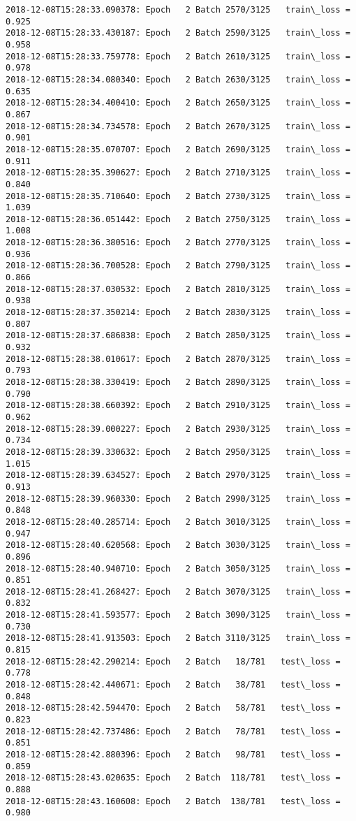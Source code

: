 \documentclass[11pt]{article}
\begin{document}
\begin{Verbatim}[commandchars=\\\{\}]
2018-12-08T15:28:33.090378: Epoch   2 Batch 2570/3125   train\_loss = 0.925
2018-12-08T15:28:33.430187: Epoch   2 Batch 2590/3125   train\_loss = 0.958
2018-12-08T15:28:33.759778: Epoch   2 Batch 2610/3125   train\_loss = 0.978
2018-12-08T15:28:34.080340: Epoch   2 Batch 2630/3125   train\_loss = 0.635
2018-12-08T15:28:34.400410: Epoch   2 Batch 2650/3125   train\_loss = 0.867
2018-12-08T15:28:34.734578: Epoch   2 Batch 2670/3125   train\_loss = 0.901
2018-12-08T15:28:35.070707: Epoch   2 Batch 2690/3125   train\_loss = 0.911
2018-12-08T15:28:35.390627: Epoch   2 Batch 2710/3125   train\_loss = 0.840
2018-12-08T15:28:35.710640: Epoch   2 Batch 2730/3125   train\_loss = 1.039
2018-12-08T15:28:36.051442: Epoch   2 Batch 2750/3125   train\_loss = 1.008
2018-12-08T15:28:36.380516: Epoch   2 Batch 2770/3125   train\_loss = 0.936
2018-12-08T15:28:36.700528: Epoch   2 Batch 2790/3125   train\_loss = 0.866
2018-12-08T15:28:37.030532: Epoch   2 Batch 2810/3125   train\_loss = 0.938
2018-12-08T15:28:37.350214: Epoch   2 Batch 2830/3125   train\_loss = 0.807
2018-12-08T15:28:37.686838: Epoch   2 Batch 2850/3125   train\_loss = 0.932
2018-12-08T15:28:38.010617: Epoch   2 Batch 2870/3125   train\_loss = 0.793
2018-12-08T15:28:38.330419: Epoch   2 Batch 2890/3125   train\_loss = 0.790
2018-12-08T15:28:38.660392: Epoch   2 Batch 2910/3125   train\_loss = 0.962
2018-12-08T15:28:39.000227: Epoch   2 Batch 2930/3125   train\_loss = 0.734
2018-12-08T15:28:39.330632: Epoch   2 Batch 2950/3125   train\_loss = 1.015
2018-12-08T15:28:39.634527: Epoch   2 Batch 2970/3125   train\_loss = 0.913
2018-12-08T15:28:39.960330: Epoch   2 Batch 2990/3125   train\_loss = 0.848
2018-12-08T15:28:40.285714: Epoch   2 Batch 3010/3125   train\_loss = 0.947
2018-12-08T15:28:40.620568: Epoch   2 Batch 3030/3125   train\_loss = 0.896
2018-12-08T15:28:40.940710: Epoch   2 Batch 3050/3125   train\_loss = 0.851
2018-12-08T15:28:41.268427: Epoch   2 Batch 3070/3125   train\_loss = 0.832
2018-12-08T15:28:41.593577: Epoch   2 Batch 3090/3125   train\_loss = 0.730
2018-12-08T15:28:41.913503: Epoch   2 Batch 3110/3125   train\_loss = 0.815
2018-12-08T15:28:42.290214: Epoch   2 Batch   18/781   test\_loss = 0.778
2018-12-08T15:28:42.440671: Epoch   2 Batch   38/781   test\_loss = 0.848
2018-12-08T15:28:42.594470: Epoch   2 Batch   58/781   test\_loss = 0.823
2018-12-08T15:28:42.737486: Epoch   2 Batch   78/781   test\_loss = 0.851
2018-12-08T15:28:42.880396: Epoch   2 Batch   98/781   test\_loss = 0.859
2018-12-08T15:28:43.020635: Epoch   2 Batch  118/781   test\_loss = 0.888
2018-12-08T15:28:43.160608: Epoch   2 Batch  138/781   test\_loss = 0.980

\end{Verbatim}
\end{document}
